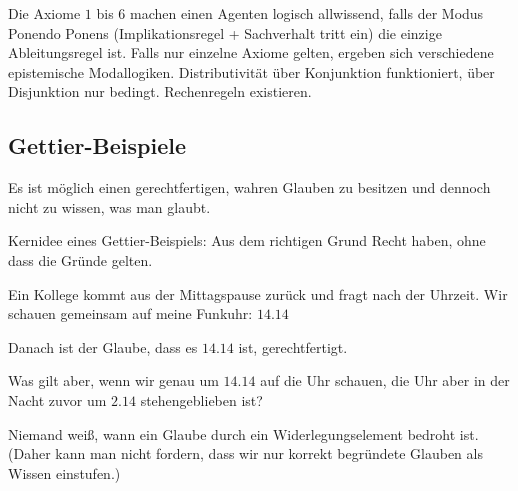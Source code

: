 \documentclass[runningheads,deutsch]{llncs}
\begin{document}
Die Axiome $1$ bis $6$ machen einen Agenten logisch allwissend, falls der Modus Ponendo Ponens (Implikationsregel + Sachverhalt tritt ein) die einzige Ableitungsregel ist. Falls nur einzelne Axiome gelten, ergeben sich verschiedene epistemische Modallogiken.
Distributivität über Konjunktion funktioniert, über Disjunktion nur bedingt. Rechenregeln existieren.

\subsection{Gettier-Beispiele}
Es ist möglich einen gerechtfertigen, wahren Glauben zu besitzen und dennoch nicht zu wissen, was man glaubt.

Kernidee eines Gettier-Beispiels: Aus dem richtigen Grund Recht haben, ohne dass die Gründe gelten.

\begin{example}
    Ein Kollege kommt aus der Mittagspause zurück und fragt nach der Uhrzeit. Wir schauen gemeinsam auf meine Funkuhr: $14.14$

    Danach ist der Glaube, dass es $14.14$ ist, gerechtfertigt. 

    Was gilt aber, wenn wir genau um $14.14$ auf die Uhr schauen, die Uhr aber in der Nacht zuvor um $2.14$ stehengeblieben ist?
\end{example}

Niemand weiß, wann ein Glaube durch ein Widerlegungselement bedroht ist. (Daher kann man nicht fordern, dass wir nur korrekt begründete Glauben als Wissen einstufen.)
\end{document}
